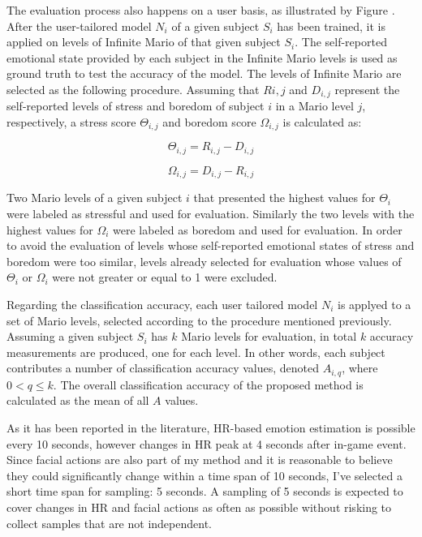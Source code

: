 The evaluation process also happens on a user basis, as illustrated by Figure \label{fig:experiment2-training-evaluation}. After the user-tailored model $N_i$ of a given subject $S_i$ has been trained, it is applied on levels of Infinite Mario of that given subject $S_i$. The self-reported emotional state provided by each subject in the Infinite Mario levels is used as ground truth to test the accuracy of the model. The levels of Infinite Mario are selected as the following procedure. Assuming that $R{i,j}$ and $D_{i,j}$ represent the self-reported levels of stress and boredom of subject $i$ in a Mario level $j$, respectively, a stress score $\Theta_{i,j}$ and boredom score $\Omega_{i,j}$ is calculated as:

\begin{equation}
  \Theta_{i,j} = R_{i,j} - D_{i,j}
  \label{eq:stress-score}
\end{equation}

\begin{equation}
  \Omega_{i,j} = D_{i,j} - R_{i,j}
  \label{eq:boredom-score}
\end{equation}

Two Mario levels of a given subject $i$ that presented the highest values for $\Theta_i$ were labeled as stressful and used for evaluation. Similarly the two levels with the highest values for $\Omega_i$ were labeled as boredom and used for evaluation. In order to avoid the evaluation of levels whose self-reported emotional states of stress and boredom were too similar, levels already selected for evaluation whose values of $\Theta_i$ or $\Omega_i$ were not greater or equal to 1 were excluded.

Regarding the classification accuracy, each user tailored model $N_i$ is applyed to a set of Mario levels, selected according to the procedure mentioned previously. Assuming a given subject $S_i$ has $k$ Mario levels for evaluation, in total $k$ accuracy measurements are produced, one for each level. In other words, each subject contributes a number of classification accuracy values, denoted $A_{i,q}$, where $0 < q \leq k$. The overall classification accuracy of the proposed method is calculated as the mean of all $A$ values.

As it has been reported in the literature, HR-based emotion estimation is possible every 10 seconds, however changes in HR peak at 4 seconds after in-game event. Since facial actions are also part of my method and it is reasonable to believe they could significantly change within a time span of 10 seconds, I’ve selected a short time span for sampling: 5 seconds. A sampling of 5 seconds is expected to cover changes in HR and facial actions as often as possible without risking to collect samples that are not independent.


